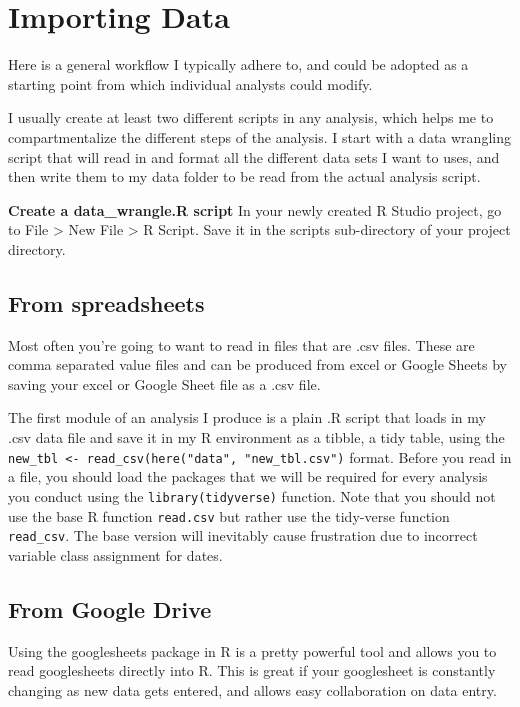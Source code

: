 \documentclass[]{book}
\begin{document}
\section{Importing Data}\label{importing-data}

Here is a general workflow I typically adhere to, and could be adopted
as a starting point from which individual analysts could modify.

I usually create at least two different scripts in any analysis, which
helps me to compartmentalize the different steps of the analysis. I
start with a data wrangling script that will read in and format all the
different data sets I want to uses, and then write them to my data
folder to be read from the actual analysis script.

\textbf{Create a data\_wrangle.R script} In your newly created R Studio
project, go to File \textgreater{} New File \textgreater{} R Script.
Save it in the scripts sub-directory of your project directory.

\subsection{From spreadsheets}\label{from-spreadsheets}

Most often you're going to want to read in files that are .csv files.
These are comma separated value files and can be produced from excel or
Google Sheets by saving your excel or Google Sheet file as a .csv file.

The first module of an analysis I produce is a plain .R script that
loads in my .csv data file and save it in my R environment as a tibble,
a tidy table, using the
\texttt{new\_tbl\ \textless{}-\ read\_csv(here("data",\ "new\_tbl.csv")}
format. Before you read in a file, you should load the packages that we
will be required for every analysis you conduct using the
\texttt{library(tidyverse)} function. Note that you should not use the
base R function \texttt{read.csv} but rather use the tidy-verse function
\texttt{read\_csv}. The base version will inevitably cause frustration
due to incorrect variable class assignment for dates.

\subsection{From Google Drive}\label{from-google-drive}

Using the googlesheets package in R is a pretty powerful tool and allows
you to read googlesheets directly into R. This is great if your
googlesheet is constantly changing as new data gets entered, and allows
easy collaboration on data entry.
\end{document}
